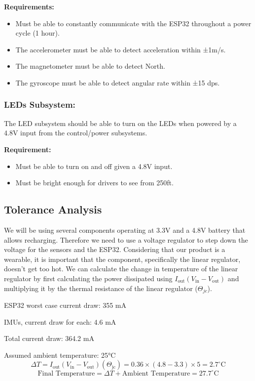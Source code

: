 \documentclass[12pt]{article}
\begin{document}
\textbf{Requirements:}
\begin{itemize}
    \item Must be able to constantly communicate with the ESP32 throughout a power cycle (1 hour). 
    \item The accelerometer must be able to detect acceleration within ±1m/s.
    \item The magnetometer must be able to detect North.
    \item The gyroscope must be able to detect angular rate within ±15 dps.
    
\end{itemize}

\subsubsection{LEDs Subsystem:} 
The LED subsystem should be able to turn on the LEDs when powered by a 4.8V input from the control/power subsystems.

\textbf{Requirement:} 
\begin{itemize}
    \item Must be able to turn on and off given a 4.8V input.
    \item Must be bright enough for drivers to see from 250ft.
    
\end{itemize}

\subsection{Tolerance Analysis}
We will be using several components operating at 3.3V and a 4.8V 
battery that allows recharging. Therefore we need to use a 
voltage regulator to step down the voltage for the sensors 
and the ESP32. Considering that our product is a wearable, it is important that the component, specifically the linear regulator, doesn't get too hot. We can calculate the change in temperature of the linear regulator by first calculating the power dissipated using $I_{\text{out}} (V_{\text{in}} - V_{\text{out}})$ and multiplying it by the thermal resistance of the linear regulator ($\Theta_{jc}$).

\noindent ESP32 worst case current draw: 355 mA

 IMUs, current draw for each: 4.6 mA

\noindent Total current draw: 364.2 mA

\noindent Assumed ambient temperature: 25°C 
\[
\Delta T = I_{\text{out}} (V_{\text{in}} - V_{\text{out}}) (\Theta_{\text{jc}}) = 0.36 \times (4.8 - 3.3) \times 5 = 2.7^\circ\text{C}
\]
\[
\text{Final Temperature} = \Delta T + \text{Ambient Temperature} = 27.7^\circ\text{C}
\]
\end{document}
